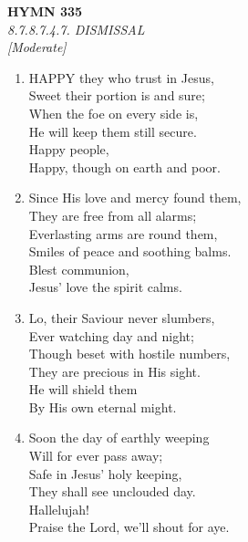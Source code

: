 \documentclass[11pt,a4paper]{article}
\begin{document}
\newpage
\begin{center}
    {\Large \textbf{HYMN 335}}
    \\
    \textit{8.7.8.7.4.7. DISMISSAL}
    \\
    \textit{\small [Moderate]}
\end{center}
\vspace{1em}

\begin{enumerate}
    \item HAPPY they who trust in Jesus, \\
        Sweet their portion is and sure; \\
        When the foe on every side is, \\
        He will keep them still secure. \\
        Happy people, \\
        Happy, though on earth and poor.

    \item Since His love and mercy found them, \\
        They are free from all alarms; \\
        Everlasting arms are round them, \\
        Smiles of peace and soothing balms. \\
        Blest communion, \\
        Jesus' love the spirit calms.

    \item Lo, their Saviour never slumbers, \\
        Ever watching day and night; \\
        Though beset with hostile numbers, \\
        They are precious in His sight. \\
        He will shield them \\
        By His own eternal might.

    \item Soon the day of earthly weeping \\
        Will for ever pass away; \\
        Safe in Jesus' holy keeping, \\
        They shall see unclouded day. \\
        Hallelujah! \\
        Praise the Lord, we'll shout for aye.

\end{enumerate}
\end{document}
